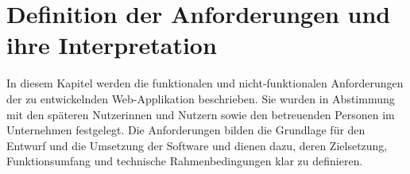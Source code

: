 \newpage
\section{Definition der Anforderungen und ihre Interpretation}
\label{sec:definition-der-anforderungen-und-ihre-interpretation}


In diesem Kapitel werden die funktionalen und nicht-funktionalen Anforderungen der zu entwickelnden Web-Applikation beschrieben.
Sie wurden in Abstimmung mit den späteren Nutzerinnen und Nutzern sowie den betreuenden Personen im Unternehmen festgelegt.
Die Anforderungen bilden die Grundlage für den Entwurf und die Umsetzung der Software und dienen dazu, deren Zielsetzung, Funktionsumfang und technische Rahmenbedingungen klar zu definieren.




